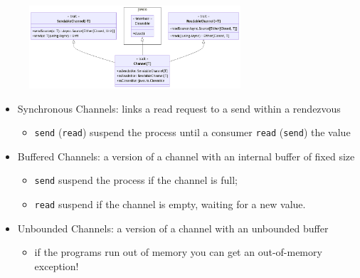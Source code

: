 \documentclass[aspectratio=1610,xcolor=dvipsnames]{beamer}
\begin{document}
\begin{frame}  
  \begin{figure}
    \centering
    \includegraphics[width=0.7\textwidth]{./images/channels-uml.png}
  \end{figure}
  \begin{itemize}
      \item Synchronous Channels: links a read request to a send within a rendezvous
      \begin{itemize}
          \item \texttt{send} (\texttt{read}) suspend the process until a consumer \texttt{read} (\texttt{send}) the value
      \end{itemize}
      \item Buffered Channels: a version of a channel with an internal buffer of fixed size
      \begin{itemize}
          \item \texttt{send} suspend the process if the channel is full;
          \item \texttt{read} suspend if the channel is empty, waiting for a new value.
      \end{itemize}
      \item Unbounded Channels: a version of a channel with an unbounded buffer
      \begin{itemize}
          \item if the programs run out of memory you can get an out-of-memory exception!
      \end{itemize}
  \end{itemize}
\end{frame}
%
\end{document}
